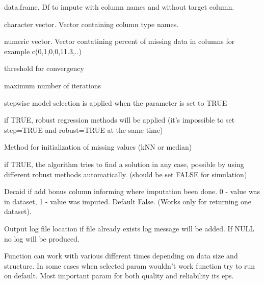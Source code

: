 \documentclass[letterpaper]{book}
\begin{document}
\begin{Arguments}
\begin{ldescription}
\item[\code{df}] data.frame. Df to impute with column names and without target column.

\item[\code{col\_type}] character vector. Vector containing column type names.

\item[\code{percent\_of\_missing}] numeric vector. Vector contatining percent of missing data in columns for example  c(0,1,0,0,11.3,..)

\item[\code{eps}] threshold for convergency

\item[\code{maxit}] maximum number of iterations

\item[\code{step}] stepwise model selection is applied when the parameter is set to TRUE

\item[\code{robust}] if TRUE, robust regression methods will be applied (it's impossible to set step=TRUE and robust=TRUE at the same time)

\item[\code{init.method}] Method for initialization of missing values (kNN or median)

\item[\code{force}] if TRUE, the algorithm tries to find a solution in any case, possible by using different robust methods automatically. (should be set FALSE for simulation)

\item[\code{col\_0\_1}] Decaid if add bonus column informing where imputation been done. 0 - value was in dataset, 1 - value was imputed. Default False. (Works only for returning one dataset).

\item[\code{out\_file}] Output log file location if file already exists log message will be added. If NULL no log will be produced.
\end{ldescription}
\end{Arguments}
%
\begin{Details}\relax
Function can work with various different times depending on data size and structure. In some cases when selected param wouldn't work function try to run on default.  Most important param for both quality and reliability  its eps.
\end{Details}
\end{document}
